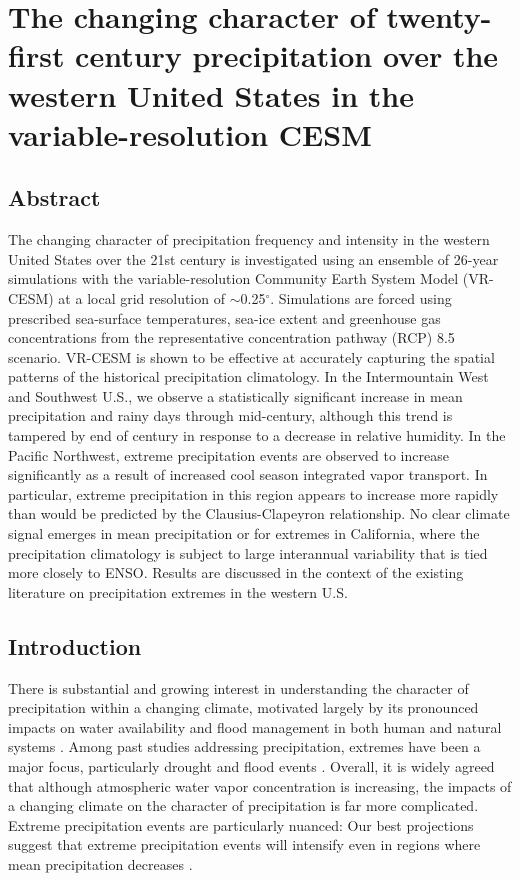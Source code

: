 \chapter{The changing character of twenty-first century precipitation over the western United States in the variable-resolution CESM}


\section{Abstract}

The changing character of precipitation frequency and intensity in the western United States over the 21st century is investigated using an ensemble of 26-year simulations with the variable-resolution Community Earth System Model (VR-CESM) at a local grid resolution of $\sim$0.25$^\circ$.  Simulations are forced using prescribed sea-surface temperatures, sea-ice extent and greenhouse gas concentrations from the representative concentration pathway (RCP) 8.5 scenario.  VR-CESM is shown to be effective at accurately capturing the spatial patterns of the historical precipitation climatology. In the Intermountain West and Southwest U.S., we observe a statistically significant increase in mean precipitation and rainy days through mid-century, although this trend is tampered by end of century in response to a decrease in relative humidity.  In the Pacific Northwest, extreme precipitation events are observed to increase significantly as a result of increased cool season integrated vapor transport.  In particular, extreme precipitation in this region appears to increase more rapidly than would be predicted by the Clausius-Clapeyron relationship.  No clear climate signal emerges in mean precipitation or for extremes in California, where the precipitation climatology is subject to large interannual variability that is tied more closely to ENSO.  Results are discussed in the context of the existing literature on precipitation extremes in the western U.S.


\section{Introduction}

There is substantial and growing interest in understanding the character of precipitation within a changing climate, motivated largely by its pronounced impacts on water availability and flood management in both human and natural systems \cite{hegerl2004detectability, kharin2007changes, scoccimarro2013heavy}.  Among past studies addressing precipitation, extremes have been a major focus, particularly drought and flood events \cite{seneviratne2012changes}.  Overall, it is widely agreed that although atmospheric water vapor concentration is increasing, the impacts of a changing climate on the character of precipitation is far more complicated.  Extreme precipitation events are particularly nuanced:  Our best projections suggest that extreme precipitation events will intensify even in regions where mean precipitation decreases \cite{tebaldi2006going, kharin2007changes}.


